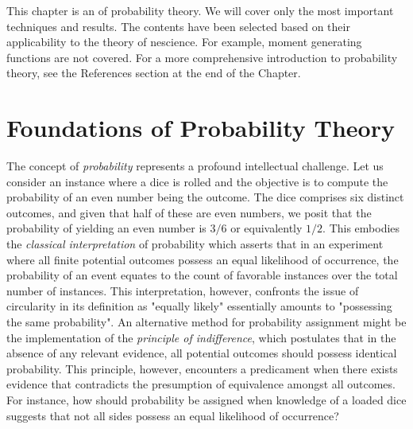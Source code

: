 This chapter is an of probability theory. We will cover only the most important techniques and results. The contents have been selected based on their applicability to the theory of nescience. For example, moment generating functions are not covered. For a more comprehensive introduction to probability theory, see the References section at the end of the Chapter.


%
%

\section{Foundations of Probability Theory}
\label{sec:probability_foundations}

The concept of \emph{probability} represents a profound intellectual challenge. Let us consider an instance where a dice is rolled and the objective is to compute the probability of an even number being the outcome. The dice comprises six distinct outcomes, and given that half of these are even numbers, we posit that the probability of yielding an even number is $3/6$ or equivalently $1/2$. This embodies the \emph{classical interpretation} of probability which asserts that in an experiment where all finite potential outcomes possess an equal likelihood of occurrence, the probability of an event equates to the count of favorable instances over the total number of instances. This interpretation, however, confronts the issue of circularity in its definition as "equally likely" essentially amounts to "possessing the same probability". An alternative method for probability assignment might be the implementation of the \emph{principle of indifference}, which postulates that in the absence of any relevant evidence, all potential outcomes should possess identical probability. This principle, however, encounters a predicament when there exists evidence that contradicts the presumption of equivalence amongst all outcomes. For instance, how should probability be assigned when knowledge of a loaded dice suggests that not all sides possess an equal likelihood of occurrence?

